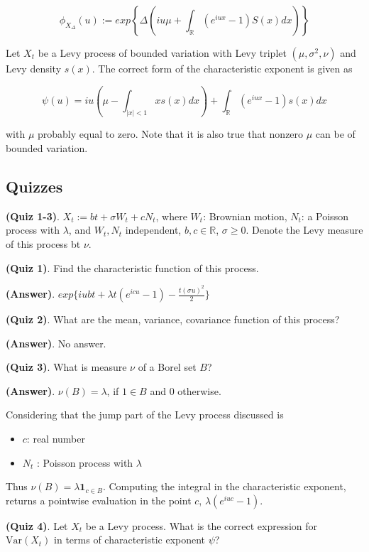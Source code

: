 \documentclass[12pt]{article}
\theoremstyle{nonumberbreak}
\begin{document}
$$
\phi_{X_\Delta} (u) := exp \left\{  \Delta \left( iu\mu + \int_\mathbb{R} (e^{iux} - 1) S(x) dx \right)  \right\}
$$


Let $X_t$ be a Levy process of bounded variation with Levy triplet $(\mu, \sigma^2, \nu)$ and Levy density $s(x)$. The correct form of the characteristic exponent is given as

$$
\psi (u) = iu \left( \mu - \int_{|x| < 1} x s(x) dx  \right) + \int_\mathbb{R} (e^{iux} - 1) s(x) dx
$$

with $\mu$ probably equal to zero. Note that it is also true that nonzero $\mu$ can be of bounded variation. 



\subsection*{Quizzes}



\textbf{(Quiz 1-3)}. $X_t := bt + \sigma W_t + c N_t$, where $W_t$: Brownian motion, $N_t$: a Poisson process with $\lambda$, and $W_t, N_t$ independent, $b,c \in \mathbb{R}$, $\sigma \ge 0$. Denote the Levy measure of this process bt $\nu$.  


\textbf{(Quiz 1)}. Find the characteristic function of this process.

\textbf{(Answer)}. $exp \{ iubt + \lambda t (e^{icu} - 1) - \frac{t(\sigma u)^2}{2} \}$

\textbf{(Quiz 2)}. What are the mean, variance, covariance function of this process?

\textbf{(Answer)}. No answer. 

\textbf{(Quiz 3)}. What is measure $\nu$ of a Borel set $B$? 

\textbf{(Answer)}. $\nu(B) = \lambda$, if $1 \in B$ and $0$ otherwise.

Considering that the jump part of the Levy process discussed is

\begin{itemize}
	\item $c$: real number
	\item $N_t$ : Poisson process with $\lambda$
\end{itemize}

Thus $\nu(B) = \lambda \mathbf{1}_{c \in B}$. Computing the integral in the characteristic exponent, returns a pointwise evaluation in the point $c$, $\lambda (e^{iuc} - 1)$.


\textbf{(Quiz 4)}. Let $X_t$ be a Levy process. What is the correct expression for $\mathrm{Var} (X_t)$ in terms of characteristic exponent $\psi$? 
\end{document}
